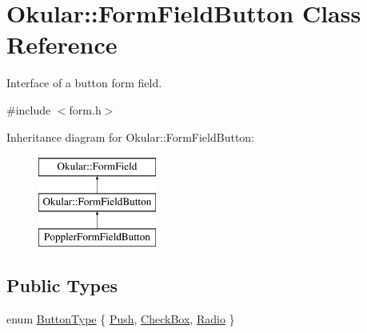 \hypertarget{classOkular_1_1FormFieldButton}{\section{Okular\+:\+:Form\+Field\+Button Class Reference}
\label{classOkular_1_1FormFieldButton}
}


Interface of a button form field.  




{\ttfamily \#include $<$form.\+h$>$}

Inheritance diagram for Okular\+:\+:Form\+Field\+Button\+:\begin{figure}[H]
\begin{center}
\leavevmode
\includegraphics[height=3.000000cm]{classOkular_1_1FormFieldButton}
\end{center}
\end{figure}
\subsection*{Public Types}
\begin{DoxyCompactItemize}
\item 
enum \hyperlink{classOkular_1_1FormFieldButton_a4b03fd77132be17273c8f4ebbd247186}{Button\+Type} \{ \hyperlink{classOkular_1_1FormFieldButton_a4b03fd77132be17273c8f4ebbd247186a695472284a9cac26351b37a9a9b5b839}{Push}, 
\hyperlink{classOkular_1_1FormFieldButton_a4b03fd77132be17273c8f4ebbd247186aa5cf5e1b5256d0772bdd6e87e4989b95}{Check\+Box}, 
\hyperlink{classOkular_1_1FormFieldButton_a4b03fd77132be17273c8f4ebbd247186aecc91a17eb86524d6f40713cd0407d4e}{Radio}
 \}
\end{DoxyCompactItemize}
